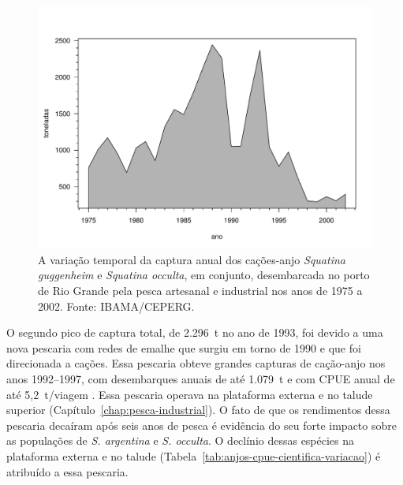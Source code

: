 \documentclass[a4paper,11pt,twoside,showtrims,onecolumn,openright,final]{memoir}
\begin{document}
%
%

\begin{figure}
\begin{center}
\includegraphics[width=\textwidth]{DesembarquesTotaisAnjos}
\end{center}
\caption[A variação temporal da captura anual dos cações-anjo \emph{Squatina guggenheim} 
	e \emph{Squatina occulta}, em conjunto, 
        desembarcada no porto de Rio Grande
	pela pesca artesanal e industrial 
	nos anos de 1975 a 2002.]
	{A variação temporal da captura anual dos cações-anjo \emph{Squatina guggenheim} 
	e \emph{Squatina occulta}, em conjunto, 
        desembarcada no porto de Rio Grande
	pela pesca artesanal e industrial 
	nos anos de 1975 a 2002. Fonte: IBAMA/CEPERG.}
\label{fig:anjos-desembarques-1975a2002}
\end{figure}


O segundo pico de captura total, de 2.296~t no ano de 1993, foi devido a uma nova pescaria 
com redes de emalhe que surgiu em torno de 1990 e que foi direcionada a cações. 
Essa pescaria obteve grandes capturas de cação-anjo nos anos 1992--1997, com desembarques 
anuais  de até 1.079~t e com CPUE anual de até 5,2~t/viagem \citep[Figura~\ref{fig:anjos-desembarques-1975a2002}]{miranda2003}. %
Essa pescaria operava na plataforma externa e no talude superior (Capítulo~\ref{chap:pesca-industrial}).
O fato de que os rendimentos dessa pescaria decaíram após seis anos de pesca é evidência do 
seu forte impacto sobre as populações de \emph{S. argentina}  e \emph{S. occulta}.
O declínio dessas espécies na plataforma externa e no talude (Tabela~\ref{tab:anjos-cpue-cientifica-variacao}) %
é atribuído a essa pescaria.
\end{document}

